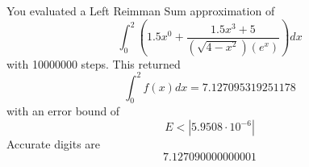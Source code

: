 \documentclass{article}
\begin{document}
You evaluated a Left Reimman Sum approximation of $$\int_{0}^{2}\left(1.5x^{0}+\frac{1.5x^3 + 5}{(\sqrt{4-x^2})(e^{x})}\right)dx$$ with 10000000 steps.
This returned$$\int_{0}^{2}f(x)dx=7.127095319251178$$ with an error bound of $$E<|5.9508\cdot 10^{-6}|$$Accurate digits are $$7.127090000000001$$
\end{document}

